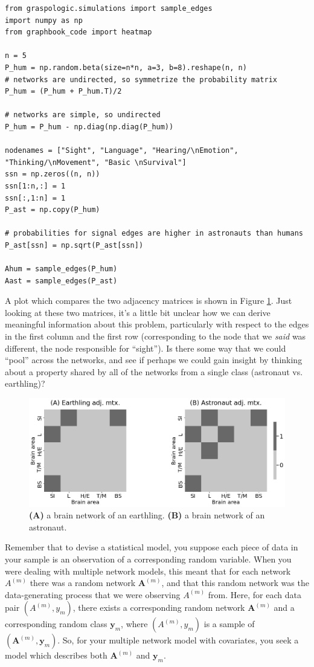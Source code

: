 \begin{lstlisting}[style=python]
from graspologic.simulations import sample_edges
import numpy as np
from graphbook_code import heatmap

n = 5
P_hum = np.random.beta(size=n*n, a=3, b=8).reshape(n, n)
# networks are undirected, so symmetrize the probability matrix
P_hum = (P_hum + P_hum.T)/2

# networks are simple, so undirected
P_hum = P_hum - np.diag(np.diag(P_hum))

nodenames = ["Sight", "Language", "Hearing/\nEmotion", "Thinking/\nMovement", "Basic \nSurvival"]
ssn = np.zeros((n, n))
ssn[1:n,:] = 1
ssn[:,1:n] = 1
P_ast = np.copy(P_hum)

# probabilities for signal edges are higher in astronauts than humans
P_ast[ssn] = np.sqrt(P_ast[ssn])

Ahum = sample_edges(P_hum)
Aast = sample_edges(P_ast)
\end{lstlisting}

A plot which compares the two adjacency matrices is shown in Figure \ref{fig:ch5:ssg_samps}. Just looking at these two matrices, it's a little bit unclear how we can derive meaningful information about this problem, particularly with respect to the edges in the first column and the first row (corresponding to the node that we \textit{said} was different, the node responsible for ``sight''). Is there some way that we could ``pool'' across the networks, and see if perhaps we could gain insight by thinking about a property shared by all of the networks from a single class (astronaut vs. earthling)?

\begin{figure}
    \centering
    \includegraphics[width=0.7\linewidth]{representations/ch5/Images/ssg_samps.png}
    \caption[Two samples of adjacency matrices from the signal sub network model]{\textbf{(A)} a brain network of an earthling. \textbf{(B)} a brain network of an astronaut.}
    \label{fig:ch5:ssg_samps}
\end{figure}

Remember that to devise a statistical model, you suppose each piece of data in your sample is an observation of a corresponding random variable. When you were dealing with multiple network models, this meant that for each network $A^{(m)}$ there was a random network $\mathbf A^{(m)}$, and that this random network was the data-generating process that we were observing $A^{(m)}$ from. Here, for each data pair $(A^{(m)}, y_m)$, there exists a corresponding random network $\mathbf A^{(m)}$ and a corresponding random class $\mathbf y_m$, where $(A^{(m)}, y_m)$ is a sample of $(\mathbf A^{(m)}, \mathbf y_m)$. So, for your multiple network model with covariates, you seek a model which describes both $\mathbf A^{(m)}$ and $\mathbf y_m$.
